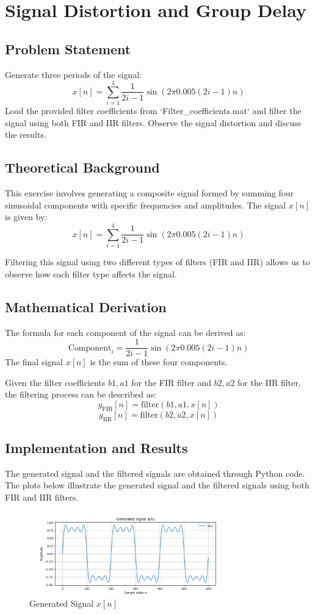 \section*{Signal Distortion and Group Delay}

\subsection*{Problem Statement}
Generate three periods of the signal:
\[ x[n]=\sum_{i=1}^{4} \frac{1}{2 i-1} \sin (2 \pi 0.005(2 i-1) n) \]
Load the provided filter coefficients from `Filter_coefficients.mat` and filter the signal using both FIR and IIR filters. Observe the signal distortion and discuss the results.

\subsection*{Theoretical Background}
This exercise involves generating a composite signal formed by summing four sinusoidal components with specific frequencies and amplitudes. The signal \( x[n] \) is given by:
\[ x[n]=\sum_{i=1}^{4} \frac{1}{2 i-1} \sin (2 \pi 0.005(2 i-1) n) \]

Filtering this signal using two different types of filters (FIR and IIR) allows us to observe how each filter type affects the signal.

\subsection*{Mathematical Derivation}
The formula for each component of the signal can be derived as:
\[ \text{Component}_i = \frac{1}{2i-1} \sin(2 \pi 0.005 (2i-1) n) \]
The final signal \( x[n] \) is the sum of these four components.

Given the filter coefficients \( b1, a1 \) for the FIR filter and \( b2, a2 \) for the IIR filter, the filtering process can be described as:
\[ y_{\text{FIR}}[n] = \text{filter}(b1, a1, x[n]) \]
\[ y_{\text{IIR}}[n] = \text{filter}(b2, a2, x[n]) \]

\subsection*{Implementation and Results}
The generated signal and the filtered signals are obtained through Python code. The plots below illustrate the generated signal and the filtered signals using both FIR and IIR filters.

\begin{figure}[h]
    \centering
    \includegraphics[width=0.8\textwidth]{fig/ex1_generated_signal.png}
    \caption{Generated Signal \( x[n] \)}
    \label{fig:ex1_generated_signal}
\end{figure}

